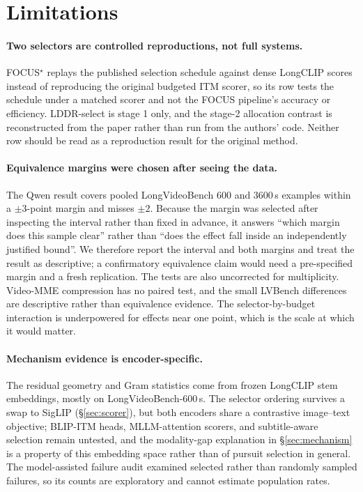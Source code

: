 \documentclass[11pt]{article}
\begin{document}
\section{Limitations}
\label{sec:limitations}

\paragraph{Two selectors are controlled reproductions, not full systems.}
FOCUS$^\star$ replays the published selection schedule against dense LongCLIP scores instead of reproducing the original budgeted ITM scorer, so its row tests the schedule under a matched scorer and not the FOCUS pipeline's accuracy or efficiency.
LDDR-select is stage 1 only, and the stage-2 allocation contrast is reconstructed from the paper rather than run from the authors' code.
Neither row should be read as a reproduction result for the original method.

\paragraph{Equivalence margins were chosen after seeing the data.}
The Qwen result covers pooled LongVideoBench 600 and 3600\,s examples within a $\pm3$-point margin and misses $\pm2$. Because the margin was selected after inspecting the interval rather than fixed in advance, it answers ``which margin does this sample clear'' rather than ``does the effect fall inside an independently justified bound''. We therefore report the interval and both margins and treat the result as descriptive; a confirmatory equivalence claim would need a pre-specified margin and a fresh replication. The tests are also uncorrected for multiplicity.
Video-MME compression has no paired test, and the small LVBench differences are descriptive rather than equivalence evidence.
The selector-by-budget interaction is underpowered for effects near one point, which is the scale at which it would matter.

\paragraph{Mechanism evidence is encoder-specific.}
The residual geometry and Gram statistics come from frozen LongCLIP stem embeddings, mostly on LongVideoBench-600\,s.
The selector ordering survives a swap to SigLIP (\S\ref{sec:scorer}), but both encoders share a contrastive image--text objective; BLIP-ITM heads, MLLM-attention scorers, and subtitle-aware selection remain untested, and the modality-gap explanation in \S\ref{sec:mechanism} is a property of this embedding space rather than of pursuit selection in general.
The model-assisted failure audit examined selected rather than randomly sampled failures, so its counts are exploratory and cannot estimate population rates.
\end{document}
